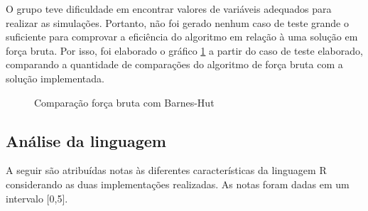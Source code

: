 \documentclass[rel_mlp]{iiufrgs}
\begin{document}
O grupo teve dificuldade em encontrar valores de variáveis adequados para realizar as simulações. Portanto,
não foi gerado nenhum caso de teste grande o suficiente para comprovar a eficiência do algoritmo em relação
à uma solução em força bruta. Por isso, foi elaborado o gráfico \ref{fig:grafico} a partir do caso de teste elaborado, comparando
a quantidade de comparações do algoritmo de força bruta com a solução implementada.

\begin{figure}[htb]
    \centering
    \caption{Comparação força bruta com Barnes-Hut}
    \label{fig:grafico}
\end{figure}



\subsection{Análise da linguagem}

A seguir são atribuídas notas às diferentes características da linguagem R
considerando as duas implementações realizadas.
As notas foram dadas em um intervalo [0,5].
\end{document}
